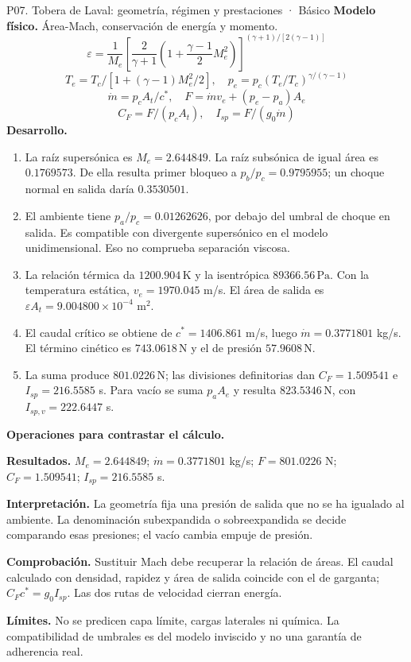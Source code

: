 \begin{studiumworked}{P07. Tobera de Laval: geometría, régimen y prestaciones · Básico}
\textbf{Modelo físico.} Área-Mach, conservación de energía y momento.
\[\varepsilon=\frac1{M_e}\left[\frac2{\gamma+1}(1+\frac{\gamma-1}2M_e^2)\right]^{(\gamma+1)/[2(\gamma-1)]}\]
\[T_e=T_c/[1+(\gamma-1)M_e^2/2],\quad p_e=p_c(T_e/T_c)^{\gamma/(\gamma-1)}\]
\[\dot m=p_cA_t/c^*,\quad F=\dot m v_e+(p_e-p_a)A_e\]
\[C_F=F/(p_cA_t),\quad I_{sp}=F/(g_0\dot m)\]
\textbf{Desarrollo.}
\begin{enumerate}
\item La raíz supersónica es $M_e=2.644849$. La raíz subsónica de igual área es $0.1769573$. De ella resulta primer bloqueo a $p_b/p_c=0.9795955$; un choque normal en salida daría $0.3530501$.
\item El ambiente tiene $p_a/p_c=0.01262626$, por debajo del umbral de choque en salida. Es compatible con divergente supersónico en el modelo unidimensional. Eso no comprueba separación viscosa.
\item La relación térmica da $1200.904\,\mathrm{K}$ y la isentrópica $89366.56\,\mathrm{Pa}$. Con la temperatura estática, $v_e=1970.045$ m/s. El área de salida es $\varepsilon A_t=9.004800\times10^{-4}$ m$^2$.
\item El caudal crítico se obtiene de $c^*=1406.861$ m/s, luego $\dot m=0.3771801$ kg/s. El término cinético es $743.0618\,\mathrm{N}$ y el de presión $57.9608\,\mathrm{N}$.
\item La suma produce $801.0226\,\mathrm{N}$; las divisiones definitorias dan $C_F=1.509541$ e $I_{sp}=216.5585$ s. Para vacío se suma $p_aA_e$ y resulta $823.5346\,\mathrm{N}$, con $I_{sp,v}=222.6447$ s.
\end{enumerate}
\textbf{Operaciones para contrastar el cálculo.}

\textbf{Resultados.} $M_e=2.644849$; $\dot m=0.3771801$ kg/s; $F=801.0226$ N; $C_F=1.509541$; $I_{sp}=216.5585$ s.

\textbf{Interpretación.} La geometría fija una presión de salida que no se ha igualado al ambiente. La denominación subexpandida o sobreexpandida se decide comparando esas presiones; el vacío cambia empuje de presión.

\textbf{Comprobación.} Sustituir Mach debe recuperar la relación de áreas. El caudal calculado con densidad, rapidez y área de salida coincide con el de garganta; $C_Fc^*=g_0I_{sp}$. Las dos rutas de velocidad cierran energía.

\textbf{Límites.} No se predicen capa límite, cargas laterales ni química. La compatibilidad de umbrales es del modelo inviscido y no una garantía de adherencia real.
\end{studiumworked}
